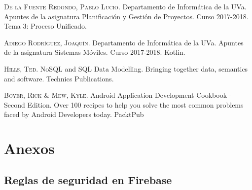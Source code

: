 \documentclass[twoside]{report}
\begin{document}
\begin{thebibliography}{a}
 \textsc{De la Fuente Redondo, Pablo Lucio}. Departamento de Informática de la UVa. Apuntes de la asignatura Planificación y Gestión de Proyectos. Curso 2017-2018. Tema 3: Proceso Unificado.



 \textsc{Adiego Rodríguez, Joaquín}. Departamento de Informática de la UVa. Apuntes de la asignatura Sistemas Móviles. Curso 2017-2018. Kotlin.

 \textsc{Hills, Ted}. NoSQL and SQL Data Modelling. Bringing together data, semantics and software. Technics Publications.

 \textsc{Boyer, Rick \& Mew, Kyle}. Android Application Development Cookbook - Second Edition. Over 100 recipes to help you solve the most common problems faced by Android Developers today. PacktPub



\end{thebibliography}

\chapter{Anexos}

\section{Reglas de seguridad en Firebase}
\end{document}
